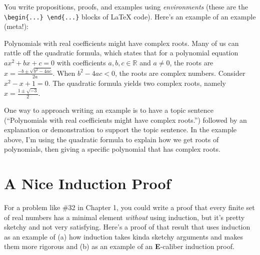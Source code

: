 \documentclass{article}
\begin{document}
You write propositions, proofs, and examples using \textit{environments} (these are the \verb|\begin{...} \end{...}| blocks of LaTeX code).  Here's an example of an example (meta!):

\begin{example*}
Polynomials with real coefficients might have complex roots.
%
Many of us can rattle off the quadratic formula, which states that for a polynomial equation $ax^2 + bx + c = 0$ with coefficients $a,b,c \in \mathbb{R}$ and $a \not = 0$, the roots are $x = \frac{-b \pm \sqrt{b^2 - 4ac}}{2a}$.
%
When $b^2 - 4ac < 0$, the roots are complex numbers. Consider $x^2 - x + 1 = 0$.  The quadratic formula yields two complex roots, namely $x = \frac{1 \pm \sqrt{-3}}{2}$.
\end{example*}

One way to approach writing an example is to have a topic sentence (``Polynomials with real coefficients might have complex roots.'') followed by an explanation or demonstration to support the topic sentence.  In the example above, I'm using the quadratic formula to explain how we get roots of polynomials, then giving a specific polynomial that has complex roots.

\section*{A Nice Induction Proof}

For a problem like \#32 in Chapter 1, you could write a proof that every finite set of real numbers has a minimal element \textit{without} using induction, but it's pretty sketchy and not very satisfying.  Here's a proof of that result that uses induction as an example of (a) how induction takes kinda sketchy arguments and makes them more rigorous and (b) as an example of an \textbf{E}-caliber induction proof.
\end{document}
